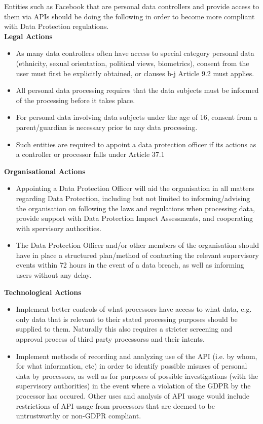 \documentclass[a4wide, 10pt]{article}
\begin{document}
Entities such as Facebook that are personal data controllers and provide access to them via APIs should be doing the following in order to become more compliant with Data Protection regulations.
\vspace{1ex} \\
\textbf{Legal Actions}
\vspace{-1ex} 
\begin{itemize}
  \item As many data controllers often have access to special category personal data (ethnicity, sexual orientation, political views, biometrics), consent from the user must first be explicitly obtained, or clauses b-j  Article 9.2 must applies.
  \item All personal data processing requires that the data subjects must be informed of the processing before it takes place.
  \item For personal data involving data subjects under the age of 16, consent from a parent/guardian is necessary prior to any data processing.
  \item Such entities are required to appoint a data protection officer if its actions as a controller or processor falls under Article 37.1
\end{itemize}
\vspace{-1ex} 
\textbf{Organisational Actions}
\vspace{-1ex} 
\begin{itemize}
  \item Appointing a Data Protection Officer will aid the organisation in all matters regarding Data Protection, including but not limited to informing/advising the organisation on following the laws and regulations when processing data, provide support with Data Protection Impact Assessments, and cooperating with spervisory authorities.
  \item The Data Protection Officer and/or other members of the organisation should have in place a structured plan/method of contacting the relevant supervisory events within 72 hours in the event of a data breach, as well as informing users without any delay.
\end{itemize}
\vspace{-1ex} 
\textbf{Technological Actions}
\vspace{-1ex} 
\begin{itemize}
  \item Implement better controls of what processors have access to what data, e.g. only data that is relevant to their stated processing purposes should be supplied to them. Naturally this also requires a stricter screening and approval process of third party processorss and their intents.
  \item Implement methods of recording and analyzing use of the API (i.e. by whom, for what information, etc) in order to identify possible misuses of personal data by processors, as well as for purposes of possible investigations (with the supervisory authorities) in the event where a violation of the GDPR by the processor has occured. Other uses and analysis of API usage would include restrictions of API usage from processors that are deemed to be untrustworthy or non-GDPR compliant.
\end{itemize}
\end{document}
